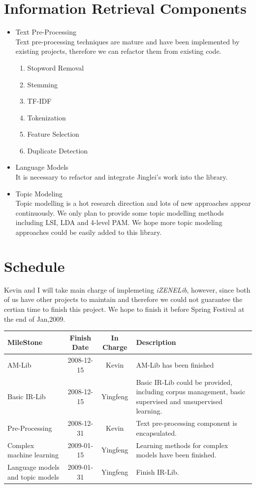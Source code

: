 \documentclass[a4paper,10pt]{article}
\begin{document}
\section{Information Retrieval Components}
\begin{itemize}
 \item Text Pre-Processing\\
Text pre-processing techniques are mature and have been implemented by existing projects, therefore we can refactor them from existing code.
    \begin{enumerate}
     \item Stopword Removal
     \item Stemming
     \item TF-IDF
     \item Tokenization
     \item Feature Selection
     \item Duplicate Detection
    \end{enumerate}
  \item Language Models\\
It is necessary to refactor and integrate Jinglei's work into the library.
  \item Topic Modeling\\
Topic modelling is a hot research direction and lots of new approaches appear continuously. We only plan to provide some topic modelling methods including
LSI, LDA and 4-level PAM. We hope more topic modeling approaches could be easily added to this library.
\end{itemize}

\section{Schedule}
Kevin and I will take main charge of implemeting \emph{iZENELib}, however, since both of us have other projects to maintain and therefore we could not 
guarantee the certian time to finish this project. We hope to finish it before Spring Festival at the end of Jan,2009.\\
\par
\centering
\begin{tabular}{|p{3cm}|c|c|p{4cm}|}
    \hline
    MileStone & Finish Date & In Charge & Description \\ \hline
    AM-Lib& 2008-12-15 & Kevin & AM-Lib has been finished \\ \hline
    Basic IR-Lib& 2008-12-15 & Yingfeng & Basic IR-Lib could be provided, including corpus management, basic supervised and unsupervised learning.  \\ \hline
    Pre-Processing& 2008-12-31 & Kevin & Text pre-processing component is encapsulated.  \\ \hline
    Complex machine learning& 2009-01-15 & Yingfeng & Learning methods for complex models have been finished. \\ \hline
    Language models and topic models& 2009-01-31 & Yingfeng & Finish IR-Lib. \\ \hline
\end{tabular}
\end{document}
